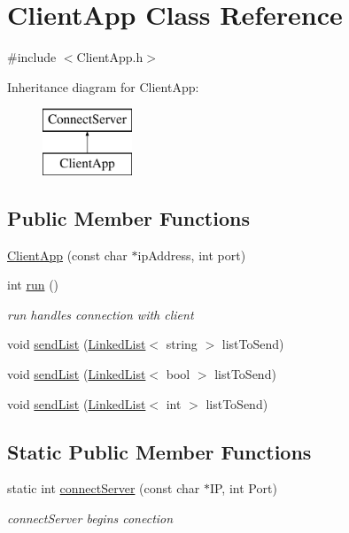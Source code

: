 \hypertarget{class_client_app}{}\section{Client\+App Class Reference}
\label{class_client_app}


{\ttfamily \#include $<$Client\+App.\+h$>$}

Inheritance diagram for Client\+App\+:\begin{figure}[H]
\begin{center}
\leavevmode
\includegraphics[height=2.000000cm]{class_client_app}
\end{center}
\end{figure}
\subsection*{Public Member Functions}
\begin{DoxyCompactItemize}
\item 
\hyperlink{class_client_app_a424f2b5dedecd5e79b22434efe8763b7}{Client\+App} (const char $\ast$ip\+Address, int port)
\item 
int \hyperlink{class_client_app_af9b66a600070083f9ac2c099e7845708}{run} ()
\begin{DoxyCompactList}\small\item\em run handles connection with client \end{DoxyCompactList}\item 
void \hyperlink{class_client_app_adb0b60d56f0399f8c55252a4fcfa2ab0}{send\+List} (\hyperlink{class_linked_list}{Linked\+List}$<$ string $>$ list\+To\+Send)
\item 
void \hyperlink{class_client_app_aebf360dfa1e4e75fafe408be459c51b0}{send\+List} (\hyperlink{class_linked_list}{Linked\+List}$<$ bool $>$ list\+To\+Send)
\item 
void \hyperlink{class_client_app_ad42207c20cb3dcda4a1adb60a07d13db}{send\+List} (\hyperlink{class_linked_list}{Linked\+List}$<$ int $>$ list\+To\+Send)
\end{DoxyCompactItemize}
\subsection*{Static Public Member Functions}
\begin{DoxyCompactItemize}
\item 
static int \hyperlink{class_client_app_a642b604643ddf44666ae2a107790fa4f}{connect\+Server} (const char $\ast$IP, int Port)
\begin{DoxyCompactList}\small\item\em connect\+Server begins conection \end{DoxyCompactList}\end{DoxyCompactItemize}
